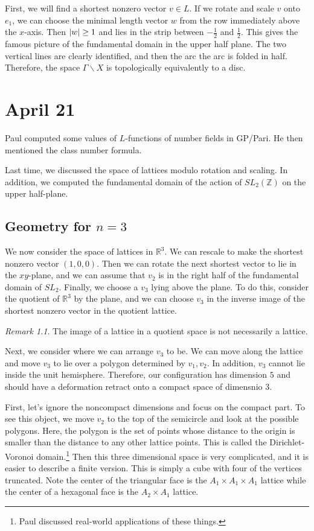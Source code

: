 \documentclass[leqno, openany]{memoir}
\theoremstyle{definition}
\theoremstyle{remark}
\newtheorem{rmk}[thm]{Remark}
\theoremstyle{plain}
\theoremstyle{definition}
\theoremstyle{remark}
\newcommand{\R}{\mathbb{R}}
\newcommand{\Z}{\mathbb{Z}}
\begin{document}
First, we will find a shortest nonzero vector $v \in L$. If we rotate and scale
$v$ onto $e_1$, we can choose the minimal length vector $w$ from the row
immediately above the $x$-axis. Then $\abs{w} \geq 1$ and lies in the strip
between $-\frac{1}{2}$ and $\frac{1}{2}$. This gives the famous picture of the
fundamental domain in the upper half plane. The two vertical lines are clearly
identified, and then the arc the arc is folded in half. Therefore, the space
$\Gamma \backslash X$ is topologically equivalently to a disc.


\chapter{April 21}%

Paul computed some values of $L$-functions of number fields in GP/Pari. He then
mentioned the class number formula.

Last time, we discussed the space of lattices modulo rotation and scaling. In
addition, we computed the fundamental domain of the action of $SL_2(\Z)$ on the
upper half-plane.

\section{Geometry for $n=3$}%


We now consider the space of lattices in $\R^3$. We can rescale to make the
shortest nonzero vector $(1,0,0)$. Then we can rotate the next shortest vector
to lie in the $xy$-plane, and we can assume that $v_2$ is in the right half of
the fundamental domain of $SL_2$. Finally, we choose a $v_3$ lying above the
plane. To do this, consider the quotient of $\R^3$ by the plane, and we can
choose $v_3$ in the inverse image of the shortest nonzero vector in the
quotient lattice.

\begin{rmk} The image of a lattice in a quotient space is not necessarily a
lattice.  \end{rmk}

Next, we consider where we can arrange $v_3$ to be. We can move along the
lattice and move $v_3$ to lie over a polygon determined by $v_1,v_2$. In
addition, $v_3$ cannot lie inside the unit hemisphere. Therefore, our
configuration has dimension $5$ and should have a deformation retract onto a
compact space of dimensnio $3$.

First, let's ignore the noncompact dimensions and focus on the compact part. To
see this object, we move $v_2$ to the top of the semicircle and look at the
possible polygons. Here, the polygon is the set of points whose distance to the
origin is smaller than the distance to any other lattice points. This is called
the Dirichlet-Voronoi domain.\footnote{Paul discussed real-world applications
of these things.} Then this three dimensional space is very complicated, and it
is easier to describe a finite version. This is simply a cube with four of the
vertices truncated. Note the center of the triangular face is the $A_1 \times
A_1 \times A_1$ lattice while the center of a hexagonal face is the $A_2 \times
A_1$ lattice.
\end{document}
